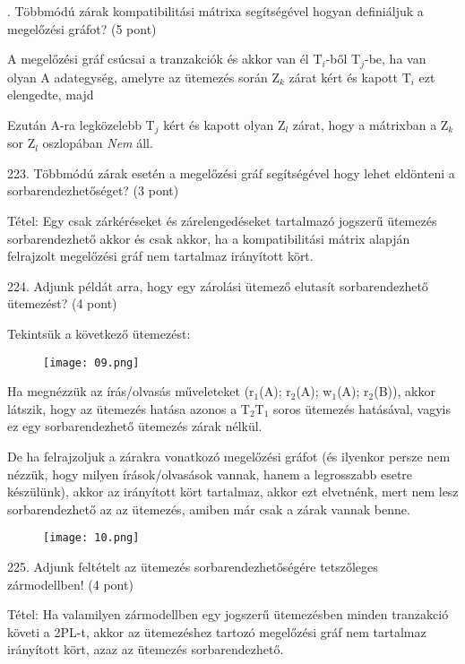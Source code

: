 \documentclass[a4paper,11.5pt, table]{article}
\begin{document}
. Többmódú zárak kompatibilitási mátrixa segítségével hogyan definiáljuk a megelőzési gráfot? (5 pont)
	\begin{compactitem}
		\item A megelőzési gráf csúcsai a tranzakciók és akkor van él T$ _{i} $-ből T$ _{j} $-be, ha van olyan A adategység, amelyre az ütemezés során Z$ _{k} $ zárat kért és kapott T$ _{i} $ ezt elengedte, majd
		\item Ezután A-ra legközelebb T$ _{j} $ kért és kapott olyan Z$ _{l} $ zárat, hogy a mátrixban a Z$ _{k} $ sor Z$ _{l} $ oszlopában \textit{Nem} áll.
	\end{compactitem}
			
223. Többmódú zárak esetén a megelőzési gráf segítségével hogy lehet eldönteni a sorbarendezhetőséget? (3 pont)
	\begin{compactitem}
		\item Tétel: Egy csak zárkéréseket és zárelengedéseket tartalmazó jogszerű ütemezés sorbarendezhető akkor és csak akkor, ha a kompatibilitási mátrix alapján felrajzolt megelőzési gráf nem tartalmaz irányított kört.
	\end{compactitem}

224. Adjunk példát arra, hogy egy zárolási ütemező elutasít sorbarendezhető ütemezést? (4 pont)
	\begin{compactitem}
		\item Tekintsük a következő ütemezést:
		\begin{figure}[h]
			\centering
			\texttt{[image: 09.png]}
		\end{figure}
		\item Ha megnézzük az írás/olvasás műveleteket (r$ _{1} $(A); r$ _{2} $(A); w$ _{1} $(A); r$ _{2} $(B)), akkor látszik, hogy az ütemezés hatása azonos a T$ _{2} $T$ _{1} $ soros ütemezés hatásával, vagyis ez egy sorbarendezhető ütemezés zárak nélkül.
		\item De ha felrajzoljuk a zárakra vonatkozó megelőzési gráfot (és ilyenkor persze nem nézzük, hogy milyen írások/olvasások vannak, hanem a legrosszabb esetre készülünk), akkor az irányított kört tartalmaz, akkor ezt elvetnénk, mert nem lesz sorbarendezhető az az ütemezés, amiben már
		csak a zárak vannak benne.
		\begin{figure}[h]
			\centering
			\texttt{[image: 10.png]}
		\end{figure}
	\end{compactitem}

225. Adjunk feltételt az ütemezés sorbarendezhetőségére tetszőleges zármodellben! (4 pont)
	\begin{compactitem}
		\item Tétel: Ha valamilyen zármodellben egy jogszerű ütemezésben minden tranzakció követi a 2PL-t, akkor az ütemezéshez tartozó megelőzési gráf nem tartalmaz irányított kört, azaz az ütemezés sorbarendezhető.
	\end{compactitem}
\end{document}
